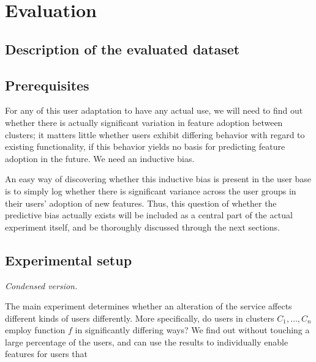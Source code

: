 \chapter{Evaluation}

\label{Chapter4}


\section{Description of the evaluated dataset} %
\label{sec:description_of_the_evaluated_dataset}


\section{Prerequisites} %
\label{sec:prerequisites}

For any of this user adaptation to have any actual use, we will need to find out whether there is actually significant variation in feature adoption between clusters; it matters little whether users exhibit differing behavior with regard to existing functionality, if this behavior yields no basis for predicting feature adoption in the future. We need an inductive bias.

An easy way of discovering whether this inductive bias is present in the user base is to simply log whether there is significant variance across the user groups in their users' adoption of new features. Thus, this question of whether the predictive bias actually exists will be included as a central part of the actual experiment itself, and be thoroughly discussed through the next sections.


\section{Experimental setup} %
\label{sec:experimental_setup}

\emph{Condensed version.}

The main experiment determines whether an alteration of the service affects different kinds of users differently.
More specifically, do users in clusters $C_1, \ldots, C_n$ employ function $f$ in significantly differing ways? We find out without touching a large percentage of the users, and can use the results to individually enable features for users that

